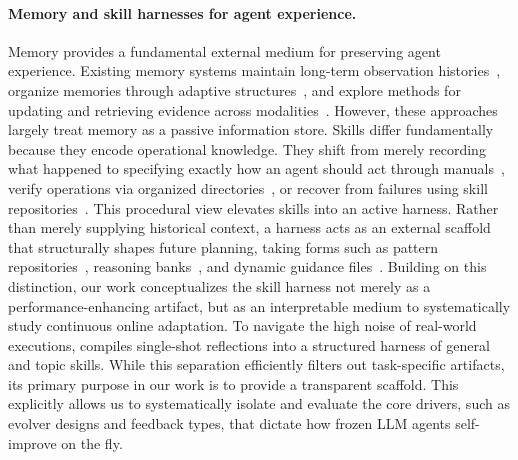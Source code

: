 \paragraph{Memory and skill harnesses for agent experience.}

Memory provides a fundamental external medium for preserving agent experience. Existing memory systems maintain long-term observation histories~\cite{zhong2024memorybank,yu2025memagent}, organize memories through adaptive structures~\cite{xu2025mem}, and explore methods for updating and retrieving evidence across modalities~\cite{huang2026rethinking,bei2026mem,liu2026omnimem}. However, these approaches largely treat memory as a passive information store. Skills differ fundamentally because they encode operational knowledge. They shift from merely recording what happened to specifying exactly how an agent should act through manuals~\cite{chen2024automanual}, verify operations via organized directories~\cite{ni2026trace2skill}, or recover from failures using skill repositories~\cite{ouyang2026skillos,wang2026skillx,zhang2026mmskills}. This procedural view elevates skills into an active harness. Rather than merely supplying historical context, a harness acts as an external scaffold that structurally shapes future planning, taking forms such as pattern repositories~\cite{ning2026code,qiu2026autorefine}, reasoning banks~\cite{ouyang2025reasoningbank}, and dynamic guidance files~\cite{suzgun2025dynamic,lee2026meta,liu2026adaptive,lin2026harness}. Building on this distinction, our work conceptualizes the skill harness not merely as a performance-enhancing artifact, but as an interpretable medium to systematically study continuous online adaptation. To navigate the high noise of real-world executions, \algname{} compiles single-shot reflections into a structured harness of general and topic skills. While this separation efficiently filters out task-specific artifacts, its primary purpose in our work is to provide a transparent scaffold. This explicitly allows us to systematically isolate and evaluate the core drivers, such as evolver designs and feedback types, that dictate how frozen LLM agents self-improve on the fly.


